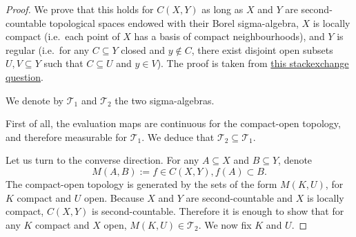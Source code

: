 \begin{proof}\leanok
We prove that this holds for $C(X, Y)$ as long as $X$ and $Y$ are second-countable topological spaces endowed with their Borel sigma-algebra, $X$ is locally compact (i.e.\ each point of $X$ has a basis of compact neighbourhoods), and $Y$ is regular (i.e.\ for any $C \subseteq Y$ closed and $y \notin C$, there exist disjoint open subsets $U, V \subseteq Y$ such that $C \subseteq U$ and $y \in V$). The proof is taken from \href{https://math.stackexchange.com/questions/4789531/when-does-the-borel-sigma-algebra-of-compact-convergence-coincide-with-the-pr}{this stackexchange question}.

We denote by $\mathcal{T}_1$ and $\mathcal{T}_2$ the two sigma-algebras.

First of all, the evaluation maps are continuous for the compact-open topology, and therefore measurable for $\mathcal{T}_1$. We deduce that $\mathcal{T}_2 \subseteq \mathcal{T}_1$.

Let us turn to the converse direction. For any $A \subseteq X$ and $B \subseteq Y$, denote
$$M(A, B) := {f \in C(X, Y), f(A) \subset B}.$$
The compact-open topology is generated by the sets of the form $M(K, U)$, for $K$ compact and $U$ open. Because $X$ and $Y$ are second-countable and $X$ is locally compact, $C(X, Y)$ is second-countable. Therefore it is enough to show that for any $K$ compact and $X$ open, $M(K, U) \in \mathcal{T}_2$. We now fix $K$ and $U$.


\end{proof}
